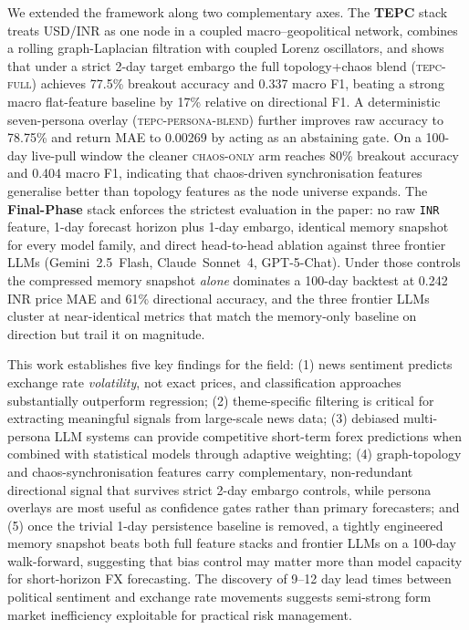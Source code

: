 \documentclass[11pt]{article}
\begin{document}
We extended the framework along two complementary axes. The \textbf{TEPC} stack treats USD/INR as one node in a coupled macro--geopolitical network, combines a rolling graph-Laplacian filtration with coupled Lorenz oscillators, and shows that under a strict 2-day target embargo the full topology+chaos blend (\textsc{tepc-full}) achieves 77.5\% breakout accuracy and 0.337 macro F1, beating a strong macro flat-feature baseline by 17\% relative on directional F1. A deterministic seven-persona overlay (\textsc{tepc-persona-blend}) further improves raw accuracy to 78.75\% and return MAE to 0.00269 by acting as an abstaining gate. On a 100-day live-pull window the cleaner \textsc{chaos-only} arm reaches 80\% breakout accuracy and 0.404 macro F1, indicating that chaos-driven synchronisation features generalise better than topology features as the node universe expands. The \textbf{Final-Phase} stack enforces the strictest evaluation in the paper: no raw \texttt{INR} feature, 1-day forecast horizon plus 1-day embargo, identical memory snapshot for every model family, and direct head-to-head ablation against three frontier LLMs (Gemini~2.5~Flash, Claude~Sonnet~4, GPT-5-Chat). Under those controls the compressed memory snapshot \emph{alone} dominates a 100-day backtest at 0.242 INR price MAE and 61\% directional accuracy, and the three frontier LLMs cluster at near-identical metrics that match the memory-only baseline on direction but trail it on magnitude.

This work establishes five key findings for the field: (1) news sentiment predicts exchange rate \textit{volatility}, not exact prices, and classification approaches substantially outperform regression; (2) theme-specific filtering is critical for extracting meaningful signals from large-scale news data; (3) debiased multi-persona LLM systems can provide competitive short-term forex predictions when combined with statistical models through adaptive weighting; (4) graph-topology and chaos-synchronisation features carry complementary, non-redundant directional signal that survives strict 2-day embargo controls, while persona overlays are most useful as confidence gates rather than primary forecasters; and (5) once the trivial 1-day persistence baseline is removed, a tightly engineered memory snapshot beats both full feature stacks and frontier LLMs on a 100-day walk-forward, suggesting that bias control may matter more than model capacity for short-horizon FX forecasting. The discovery of 9--12 day lead times between political sentiment and exchange rate movements suggests semi-strong form market inefficiency exploitable for practical risk management.
\end{document}

